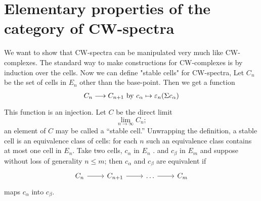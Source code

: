 \documentclass[../main]{subfiles}
\begin{document}
\chapter{Elementary properties of the category of CW-spectra}
\label{sec:p3ch03}


    
We want to show that CW-spectra can be manipulated very much
like CW-complexes. The standard way to make constructions for
CW-complexes is by induction over the cells. Now we can define "stable
cells"  for CW-spectra, Let $C_n$ be the set of cells in $E_n$ other than
the base-point. Then we get a function 
\[C_n \lar{}C_{n+1} \text{ by } c_\alpha \mapsto \varepsilon_n(\Sigma c_\alpha)\]
This function is an injection. Let $C$ be the direct limit \[\lim_{n\to\infty} C_n;\]
an element of $C$ may be called a ``stable cell.'' Unwrapping the definition, a stable cell is an equivalence class of cells: for each $n$ such
an equivalence class contains at most one cell in $E_n$. Take two cells,
$c_\alpha$ in $E_n$ . and $c_\beta$ in $E_m$ and suppose without loss of generality $n\leq m$; then $c_\alpha$ and $c_\beta$ are equivalent if 
\[
\begin{tikzcd}
C_n \arrow[r] & C_{n+1} \arrow[r] & \dots \arrow[r] & C_m
\end{tikzcd}\]
maps $c_\alpha$ into $c_\beta$.
\end{document}
